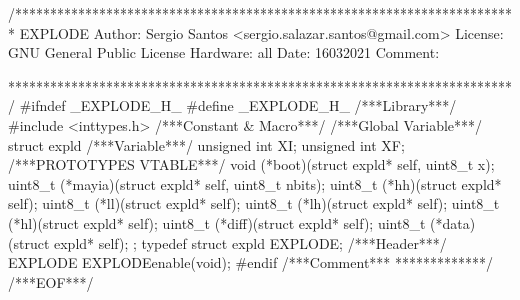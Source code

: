 \begin{verbatimtab}
/************************************************************************
EXPLODE
Author: Sergio Santos
<sergio.salazar.santos@gmail.com>
License: GNU General Public License
Hardware: all
Date: 16032021
Comment:

************************************************************************/
#ifndef _EXPLODE_H_
	#define _EXPLODE_H_
	/***Library***/
	#include <inttypes.h>
	/***Constant & Macro***/
	/***Global Variable***/
	struct expld{
		/***Variable***/
		unsigned int XI;
		unsigned int XF;
		/***PROTOTYPES VTABLE***/
		void (*boot)(struct expld* self, uint8_t x);
		uint8_t (*mayia)(struct expld* self, uint8_t nbits);
		uint8_t (*hh)(struct expld* self);
		uint8_t (*ll)(struct expld* self);
		uint8_t (*lh)(struct expld* self);
		uint8_t (*hl)(struct expld* self);
		uint8_t (*diff)(struct expld* self);
		uint8_t (*data)(struct expld* self);
	};
	typedef struct expld EXPLODE;
	/***Header***/
	EXPLODE EXPLODEenable(void);
#endif
/***Comment***
*************/
/***EOF***/
\end{verbatimtab}